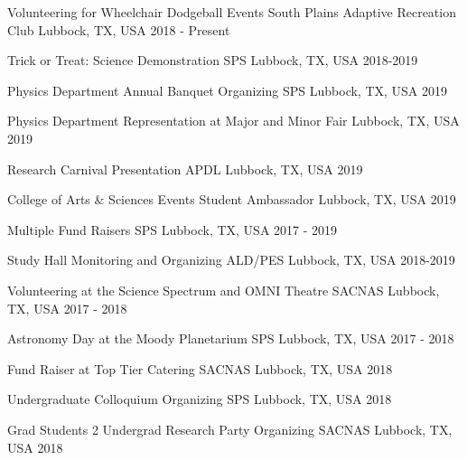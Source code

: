 
\begin{cvhonors}

    \cvhonor
    {Volunteering for Wheelchair Dodgeball Events}
    {South Plains Adaptive Recreation Club}
    {Lubbock, TX, USA}
    {2018 - Present}

    \cvhonor
    {Trick or Treat: Science Demonstration}
    {SPS}
    {Lubbock, TX, USA}
    {2018-2019}

    \cvhonor
    {Physics Department Annual Banquet Organizing}
    {SPS}
    {Lubbock, TX, USA}
    {2019}

    \cvhonor
    {Physics Department Representation at Major and Minor Fair}
    {}
    {Lubbock, TX, USA}
    {2019}

    \cvhonor
    {Research Carnival Presentation}
    {APDL}
    {Lubbock, TX, USA}
    {2019}

    \cvhonor
    {College of Arts \& Sciences Events}
    {Student Ambassador}
    {Lubbock, TX, USA}
    {2019}


    \cvhonor
    {Multiple Fund Raisers}
    {SPS}
    {Lubbock, TX, USA}
    {2017 - 2019}

    \cvhonor
    {Study Hall Monitoring and Organizing}
    {ALD/PES}
    {Lubbock, TX, USA}
    {2018-2019}

    \cvhonor
    {Volunteering at the Science Spectrum and OMNI Theatre}
    {SACNAS}
    {Lubbock, TX, USA}
    {2017 - 2018}

    \cvhonor
    {Astronomy Day at the Moody Planetarium}
    {SPS}
    {Lubbock, TX, USA}
    {2017 - 2018}

    \cvhonor
    {Fund Raiser at Top Tier Catering}
    {SACNAS}
    {Lubbock, TX, USA}
    {2018}

    \cvhonor
    {Undergraduate Colloquium Organizing}
    {SPS}
    {Lubbock, TX, USA}
    {2018}


    \cvhonor
    {Grad Students 2 Undergrad Research Party Organizing}
    {SACNAS}
    {Lubbock, TX, USA}
    {2018}


\end{cvhonors}
